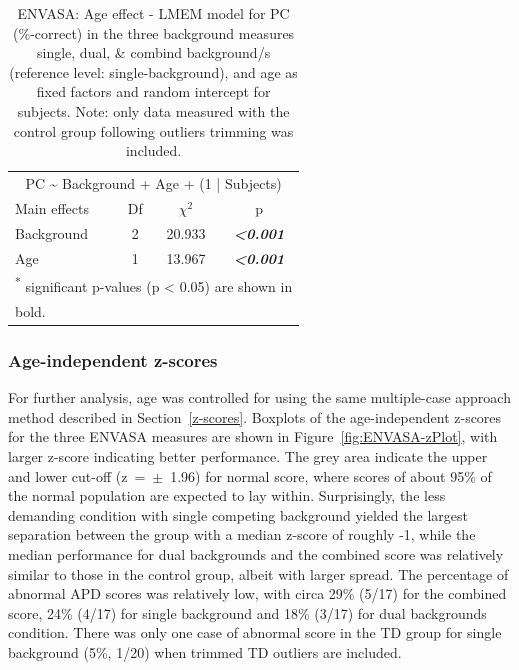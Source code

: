 \documentclass[a4paper, twoside]{templates/ociamthesis}
\begin{document}
\begin{table}

\caption{\label{tab:ENVASA-AgeLMEMTab}ENVASA: Age effect - LMEM model for PC (\%-correct) in the three background measures single, dual, \& combind background/s (reference level: single-background), and age as fixed factors and random intercept for subjects. Note: only data measured with the control group following outliers trimming was included.}
\centering
\begin{tabular}[t]{lcc>{}c}
\toprule
\multicolumn{4}{c}{PC \textasciitilde{} Background + Age + (1 | Subjects)} \\
\cmidrule(l{3pt}r{3pt}){1-4}
Main effects & Df & $\chi^{2}$ & p\\
\midrule
Background & 2 & 20.933 & \em{\textbf{<0.001}}\\
Age & 1 & 13.967 & \em{\textbf{<0.001}}\\
\bottomrule
\multicolumn{4}{l}{\textsuperscript{*} significant p-values (p < 0.05) are shown in}\\
\multicolumn{4}{l}{bold.}\\
\end{tabular}
\end{table}

\hypertarget{age-independent-z-scores-2}{%
\subsubsection*{Age-independent z-scores}\label{age-independent-z-scores-2}}

For further analysis, age was controlled for using the same multiple-case approach method described in Section~\ref{z-scores}. Boxplots of the age-independent z-scores for the three ENVASA measures are shown in Figure~\ref{fig:ENVASA-zPlot}, with larger z-score indicating better performance. The grey area indicate the upper and lower cut-off (z~=~\(\pm\)~1.96) for normal score, where scores of about 95\% of the normal population are expected to lay within. Surprisingly, the less demanding condition with single competing background yielded the largest separation between the group with a median z-score of roughly -1, while the median performance for dual backgrounds and the combined score was relatively similar to those in the control group, albeit with larger spread. The percentage of abnormal APD scores was relatively low, with circa 29\% (5/17) for the combined score, 24\% (4/17) for single background and 18\% (3/17) for dual backgrounds condition. There was only one case of abnormal score in the TD group for single background (5\%, 1/20) when trimmed TD outliers are included.\\
\end{document}
